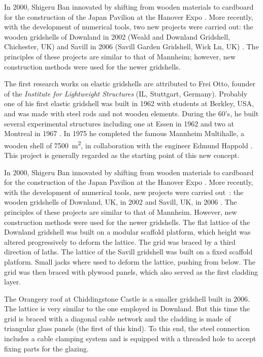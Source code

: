 In 2000, Shigeru Ban innovated by shifting from wooden materials to cardboard for the construction of the Japan Pavilion at the Hanover Expo \cite{McQuaid2006}. More recently, with the development of numerical tools, two new projects were carried out: the wooden gridshells of Downland in 2002 (Weald and Downland Gridshell, Chichester, UK) \cite{Harris2003} and Savill in 2006 (Savill Garden Gridshell, Wick Ln, UK) \cite{Harris2008}. The principles of these projects are similar to that of Mannheim; however, new construction methods were used for the newer gridshells.

The first research works on elastic gridshells are attributed to Frei Otto, founder of the \emph{Institute for Lightweight Structures} (IL, Stuttgart, Germany). Probably one of his first elastic gridshell was built in 1962 with students at Berkley, USA, and was made with steel rods and not wooden elements. During the 60's, he built several experimental structures including one at Essen in 1962 and two at Montreal in 1967 \cite{Liddell2015}. In 1975 he completed the famous Mannheim Multihalle, a wooden shell of \SI{7500 }{m^2}, in collaboration with the engineer Edmund Happold \cite{Happold1975,Otto1976}. This project is generally regarded as the starting point of this new concept.

In 2000, Shigeru Ban innovated by shifting from wooden materials to cardboard for the construction of the Japan Pavilion at the Hanover Expo \cite{McQuaid2006}. More recently, with the development of numerical tools, new projects were carried out~: the wooden gridshells of Downland, UK, in 2002 \cite{Harris2003} and Savill, UK, in 2006 \cite{Harris2008}. The principles of these projects are similar to that of Mannheim. However, new construction methods were used for the newer gridshells. The flat lattice of the Downland gridshell was built on a modular scaffold platform, which height was altered progressively to deform the lattice. The grid was braced by a third direction of laths. The lattice of the Savill gridshell was built on a fixed scaffold platform. Small jacks where used to deform the lattice, pushing from below. The grid was then braced with plywood panels, which also served as the first cladding layer. 

The Orangery roof at Chiddingstone Castle is a smaller gridshell built in 2006. The lattice is very similar to the one employed in Downland. But this time the grid is braced with a diagonal cable network and the cladding is made of triangular glass panels (the first of this kind). To this end, the steel connection includes a cable clamping system and is equipped with a threaded hole to accept fixing parts for the glazing.




